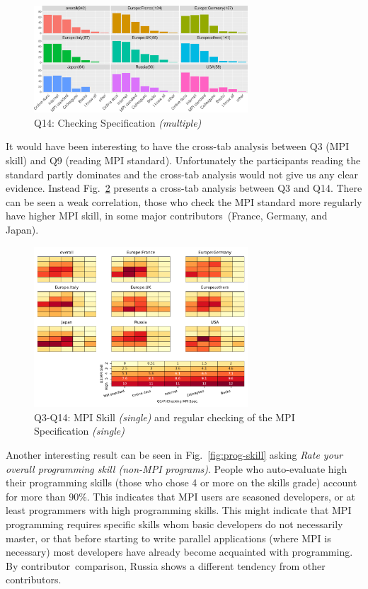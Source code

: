 \documentclass[preprint,5p,times]{elsarticle}
\def\myquote#1{{\it #1}}
\newcommand{\revision}[2]{{\color{blue}#2}}
\def\country{contributor\xspace{}}%
\def\countries{contributors\xspace{}}%
\def\mcountries{major contributors\xspace{}}%
\begin{document}
\begin{figure}[tb]
\begin{center}
\includegraphics[width=8.0cm]{R-scripts/Q14.pdf}
\vspace{-2mm}
\caption{Q14: Checking Specification {\it(multiple)}}
\label{fig:checking-spec}
\end{center}
\end{figure}

It would have been interesting to have the cross-tab analysis between Q3 (MPI
skill) and Q9 (reading MPI standard). Unfortunately the participants reading the
standard partly dominates and the cross-tab analysis would not give us any clear
evidence.
%
Instead Fig.~\ref{fig:reading-standard-and-checking-spec} presents a cross-tab
analysis between Q3 and Q14. There can be seen a weak correlation, those who
\revision{check more regularly the MPI standard}{check the MPI
  standard more regularly} have higher MPI skill, in some
\mcountries\  (France, Germany, and Japan).

\begin{figure}[tb]
\begin{center}
\includegraphics[width=8.0cm]{Figs/Q3-Q14.pdf}
\caption{Q3-Q14: MPI Skill {\it(single)} and regular checking of the MPI Specification {\it(single)}}
\label{fig:reading-standard-and-checking-spec}
\end{center}
\end{figure}

Another interesting result can be seen in Fig.~\ref{fig:prog-skill} asking
\myquote{Rate your overall programming skill (non-MPI programs)}. People who
auto-evaluate  high their programming skills (\revision{basically }{}those who chose 4 or
more on the skills grade) account for more than 90\%. This indicates that MPI
users are seasoned developers, or at least programmers with high programming
skills. This might indicate that MPI programming requires specific skills whom
basic developers do not necessarily master, or that before starting to write
parallel applications (where MPI is necessary) most developers have already
become acquainted with programming. By \country\ comparison, Russia shows a
different tendency from other \countries.
\end{document}
